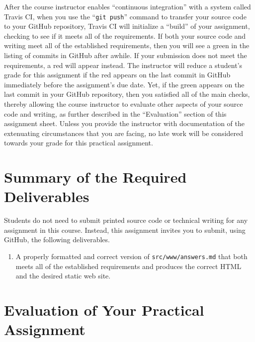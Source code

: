 \documentclass[11pt]{article}
\newcommand{\mainprogramsource}{\lstinline{src/www/answers.md}}
\newcommand{\gitpush}{\command{git push}}
\newcommand{\command}[1]{``\lstinline{#1}''}
\newcommand{\step}[1]{``{#1}''}
\newcommand{\checkmark}{\ding{51}}
\newcommand{\naughtmark}{\ding{55}}
\begin{document}
After the course instructor enables \step{continuous integration} with a system called Travis CI, when you use the
\gitpush{} command to transfer your source code to your GitHub repository, Travis CI will initialize a \step{build} of
your assignment, checking to see if it meets all of the requirements. If both your source code and writing meet all of
the established requirements, then you will see a green \checkmark{} in the listing of commits in GitHub after awhile.
If your submission does not meet the requirements, a red \naughtmark{} will appear instead. The instructor will reduce a
student's grade for this assignment if the red \naughtmark{} appears on the last commit in GitHub immediately before the
assignment's due date. Yet, if the green \checkmark{} appears on the last commit in your GitHub repository, then you
satisfied all of the main checks, thereby allowing the course instructor to evaluate other aspects of your source code
and writing, as further described in the \step{Evaluation} section of this assignment sheet. Unless you provide the
instructor with documentation of the extenuating circumstances that you are facing, no late work will be considered
towards your grade for this practical assignment.

\section*{Summary of the Required Deliverables}

\noindent Students do not need to submit printed source code or technical writing for any assignment in this course.
Instead, this assignment invites you to submit, using GitHub, the following deliverables.

\begin{enumerate}

\setlength{\itemsep}{0in}

\item A properly formatted and correct version of \mainprogramsource{} that both meets all of the established
  requirements and produces the correct HTML and the desired static web site.

\end{enumerate}

\section*{Evaluation of Your Practical Assignment}
\end{document}
